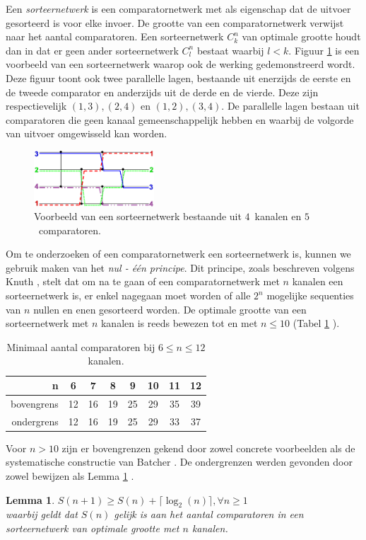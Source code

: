 \documentclass{article}
\newtheorem{lemma}{Lemma}
\begin{document}
Een \textit{sorteernetwerk} is een comparatornetwerk met als eigenschap dat de uitvoer gesorteerd is voor elke invoer.
De grootte van een comparatornetwerk verwijst naar het aantal comparatoren. 
Een sorteernetwerk $C^n_k$ van optimale grootte houdt dan in dat er geen ander sorteernetwerk $C^n_l$ bestaat waarbij $l < k$.
Figuur \ref{Werking} is een voorbeeld van een sorteernetwerk waarop ook de werking gedemonstreerd wordt.
Deze figuur toont ook twee parallelle lagen, bestaande uit enerzijds de eerste en de tweede comparator en anderzijds uit de derde en de vierde.
Deze zijn respectievelijk $(1,3), (2,4)$ en $(1,2), (3,4)$.
De parallelle lagen bestaan uit comparatoren die geen kanaal gemeenschappelijk hebben en waarbij de volgorde van uitvoer omgewisseld kan worden.
\begin{figure}[!h]
	\centering
	\includegraphics[width=0.4\textwidth]{NetworkTransparent.png} 
	\caption{Voorbeeld van een sorteernetwerk bestaande uit $4$~kanalen en $5$~comparatoren.}
	\label{Werking}
\end{figure}

Om te onderzoeken of een comparatornetwerk een sorteernetwerk is, kunnen we gebruik maken van het \textit{nul - \'e\'en principe}. 
Dit principe, zoals beschreven volgens Knuth \cite{Knuth3}, stelt dat om na te gaan of een comparatornetwerk met $n$ kanalen een sorteernetwerk is, er enkel nagegaan moet worden of alle $2^n$ mogelijke sequenties van $n$ nullen en enen gesorteerd worden.
De optimale grootte van een sorteernetwerk met $n$ kanalen is reeds bewezen tot en met $n \leq 10$ (Tabel \ref{tabel1} \cite{sortingNetworksSize2014}).
\begin{table}[h!]
	\centering
	\begin{tabular}{r|c|c|c|c|c|c|c}
	n & 6 & 7 & 8 & 9 & 10 & 11 & 12\\ 
	\hline 
	bovengrens & 12 & 16 & 19 & 25 & 29 & 35 & 39\\ 
	\hline 
	ondergrens & 12 & 16 & 19 & 25& 29 & 33 & 37\\
	\end{tabular} 
	\caption{Minimaal aantal comparatoren bij $6 \leq n \leq 12$ kanalen.}
	\label{tabel1}
\end{table}

Voor $n > 10$ zijn er bovengrenzen gekend door zowel concrete voorbeelden als de systematische constructie van Batcher \cite{sortingNetworksApplications}. 
De ondergrenzen werden gevonden door zowel bewijzen als Lemma \ref{lemma1} \cite{Voorhis1972}.
\begin{lemma}
	$S(n+1) \geq S(n) + \lceil \log_2(n) \rceil, \forall n \geq 1$\\
	waarbij geldt dat $S(n)$ gelijk is aan het aantal comparatoren in een sorteernetwerk van optimale grootte met $n$ kanalen.
	\label{lemma1}
\end{lemma}
\end{document}
